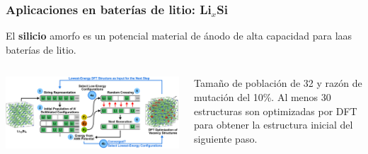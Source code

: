 \documentclass[aspectratio=169]{beamer}
\let\oldtextbf\textbf
\renewcommand{\textbf}[1]{\textcolor{nordblue}{\oldtextbf{#1}}}
\begin{document}
    \begin{frame}
        \frametitle{Aplicaciones en baterías de litio: Li$_x$Si}
        
        El \textbf{silicio} amorfo es un potencial material de ánodo de alta
        capacidad para laas baterías de litio.
        
        \begin{columns}
            \begin{center}
                \includegraphics[width=\columnwidth]{LiSi-metodo.png}
            \end{center}

            Tamaño de población de 32 y razón de mutación del 10\%. Al menos 30 
            estructuras son optimizadas por DFT para obtener la estructura inicial
            del siguiente paso.
        \end{columns}
            
    \end{frame}
    
\end{document}
